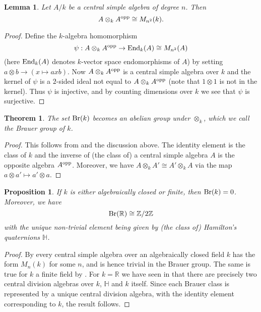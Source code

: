 \documentclass[11pt]{amsart}
\numberwithin{equation}{section}
\newtheorem{theorem}[equation]{Theorem}
\newtheorem{lemma}[equation]{Lemma}
\newtheorem{proposition}[equation]{Proposition}
\theoremstyle{remark}
\theoremstyle{remark}
\theoremstyle{remark}
\theoremstyle{definition}
\theoremstyle{definition}
\theoremstyle{definition}
\theoremstyle{definition}
\theoremstyle{definition}
\theoremstyle{definition}
\begin{document}
\begin{lemma} \label{inverse lemma}
Let $A/k$ be a central simple algebra of degree $n$. Then 
\[A\otimes_k A^\textup{opp}\cong M_{n^2}(k).\]
\end{lemma}

\begin{proof}
Define the $k$-algebra homomorphism \[\psi:A\otimes_k A^{\textup{opp}}\rightarrow \textup{End}_k(A)\cong M_{n^2}(A)\] (here $\textup{End}_k(A)$ denotes $k$-vector space endomorphisms of $A$) by setting $a\otimes b\rightarrow (x\mapsto axb)$. Now $A\otimes_k A^{\textup{opp}}$ is a central simple algebra over $k$ and the kernel of $\psi$ is a $2$-sided ideal not equal to $A\otimes_k A^{\textup{opp}}$ (note that $1\otimes 1$ is not in the kernel). Thus $\psi$ is injective, and by counting dimensions over $k$ we see that $\psi$ is surjective.
\end{proof}

\begin{theorem}
The set $\textup{Br}(k)$ becomes an abelian group under $\otimes_k$, which we call the \emph{Brauer group} of $k$. 
\end{theorem}

\begin{proof}
This follows from  and the discussion above. The identity element is the class of $k$ and the inverse of (the class of) a central simple algebra $A$ is the opposite algebra $A^{\textup{opp}}$. Moreover, we have $A\otimes_k A'\cong A'\otimes_k A$ via the map $a\otimes a'\mapsto a'\otimes a$.
\end{proof}

\begin{proposition} \label{examples of brauer}
If $k$ is either algebraically closed or finite, then $\textup{Br}(k)=0$. Moreover, we have
\[\textup{Br}(\mathbb{R})\cong \mathbb{Z}/2\mathbb{Z}\]
with the unique non-trivial element being given by (the class of) Hamilton's quaternions $\mathbb{H}$. 
\end{proposition}

\begin{proof}
By  every central simple algebra over an algebraically closed field $k$ has the form $M_n(k)$ for some $n$, and is hence trivial in the Brauer group. The same is true for $k$ a finite field by . For $k=\mathbb{R}$ we have seen in  that there are precisely two central division algebras over $k$, $\mathbb{H}$ and $k$ itself. Since each Brauer class is represented by a unique central division algebra, with the identity element corresponding to $k$, the result follows.
\end{proof}
\end{document}
